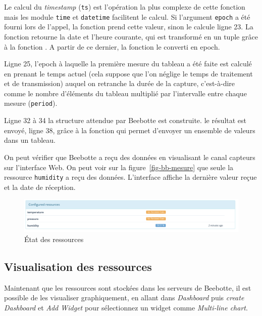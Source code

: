        \vspace{1em}

Le calcul du \textit{timestamp} (\texttt{ts}) est l’opération la plus complexe de cette fonction mais les module \texttt{time} et \texttt{datetime} facilitent le calcul. 
Si l'argument \texttt{epoch} a été fourni lors de l'appel, la fonction prend cette valeur, sinon le calcule ligne 23. La fonction  retourne la date et l'heure courante, qui est transformé en un tuple grâce à la fonction . A partir de ce dernier, la fonction  le converti en epoch. 



Ligne 25, l'epoch à laquelle la première mesure du tableau a été faite est calculé en prenant le temps actuel (cela suppose que l’on néglige le temps de traitement et de transmission) auquel on retranche la durée de la capture, c’est-à-dire comme le nombre d’éléments du tableau multiplié par l’intervalle entre chaque mesure (\texttt{period}). 

Ligne 32 à 34 la structure attendue par Beebotte est construite. le résultat est envoyé, ligne 38, grâce à la fonction  qui permet d'envoyer un ensemble de valeurs dans un tableau.

       \vspace{1em}

On peut vérifier que Beebotte a reçu des données en visualisant le canal capteurs sur l’interface Web. On peut voir sur la  figure~\vref{fig-bb-mesure} que seule la ressource \texttt{humidity} a reçu des données. L’interface affiche la dernière valeur reçue et la date de réception.

\begin{figure}[tbp]
\centerline{\includegraphics[width=1\columnwidth]{Pictures/bb_mesures.png}}
\caption{État des ressources}
\label{fig-bb-mesure}
\end{figure}

\subsection{Visualisation des ressources}

Maintenant que les ressources sont stockées dans les serveurs de Beebotte, il est possible de les visualiser graphiquement, en allant dans \textit{Dashboard} puis \textit{create Dashboard} et \textit {Add Widget} pour sélectionnez un widget comme \textit{Multi-line chart}.

